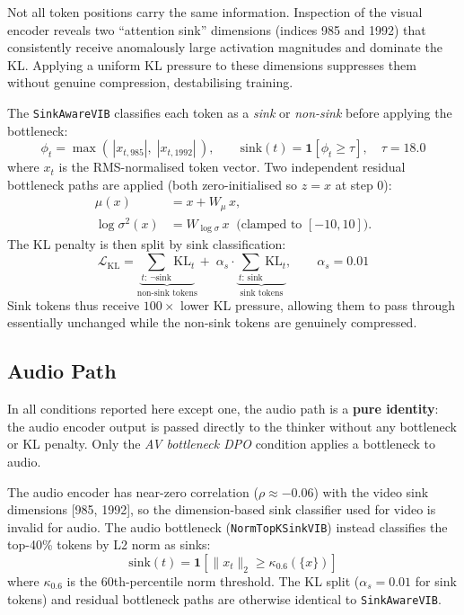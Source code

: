 \documentclass[11pt,a4paper]{article}
\begin{document}
Not all token positions carry the same information.  Inspection of the visual
encoder reveals two ``attention sink'' dimensions (indices 985 and 1992) that
consistently receive anomalously large activation magnitudes and dominate the
KL.  Applying a uniform KL pressure to these dimensions suppresses them
without genuine compression, destabilising training.

The \texttt{SinkAwareVIB} classifies each token as a \emph{sink} or
\emph{non-sink} before applying the bottleneck:
\[
  \phi_t = \max\!\left(\,|x_{t,985}|,\;|x_{t,1992}|\,\right),
  \qquad
  \text{sink}(t) = \mathbf{1}\!\left[\phi_t \geq \tau\right], \quad \tau = 18.0
\]
where $x_t$ is the RMS-normalised token vector.  Two independent residual
bottleneck paths are applied (both zero-initialised so $z = x$ at step 0):
\begin{align*}
  \mu(x) &= x + W_\mu\,x, \\
  \log\sigma^2(x) &= W_{\log\sigma}\,x\;\;\text{(clamped to }[-10,10]\text{)}.
\end{align*}
The KL penalty is then split by sink classification:
\[
  \mathcal{L}_{\mathrm{KL}} =
    \underbrace{\sum_{t:\,\neg\text{sink}} \mathrm{KL}_t}_{\text{non-sink tokens}}
    + \;\alpha_s \cdot \underbrace{\sum_{t:\,\text{sink}} \mathrm{KL}_t}_{\text{sink tokens}},
  \qquad \alpha_s = 0.01
\]
Sink tokens thus receive $100\times$ lower KL pressure, allowing them to pass
through essentially unchanged while the non-sink tokens are genuinely
compressed.

\subsection{Audio Path}

In all conditions reported here except one, the audio path is a \textbf{pure
identity}: the audio encoder output is passed directly to the thinker without
any bottleneck or KL penalty.  Only the \emph{AV bottleneck DPO} condition
applies a bottleneck to audio.

The audio encoder has near-zero correlation ($\rho \approx -0.06$) with the
video sink dimensions [985, 1992], so the dimension-based sink classifier used
for video is invalid for audio.  The audio bottleneck (\texttt{NormTopKSinkVIB})
instead classifies the top-40\% tokens by L2 norm as sinks:
\[
  \text{sink}(t) = \mathbf{1}\!\left[\|x_t\|_2 \geq \kappa_{0.6}(\{x\})\right]
\]
where $\kappa_{0.6}$ is the 60th-percentile norm threshold.  The KL split
($\alpha_s = 0.01$ for sink tokens) and residual bottleneck paths are
otherwise identical to \texttt{SinkAwareVIB}.
\end{document}
